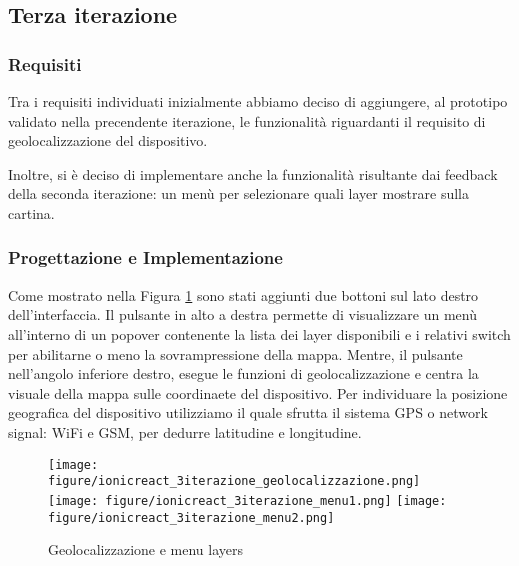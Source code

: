 \documentclass[a4paper]{report}
\begin{document}
\subsection*{{Terza iterazione}}

\subsubsection*{{Requisiti}}
Tra i requisiti individuati inizialmente abbiamo deciso di aggiungere, al prototipo validato nella precendente iterazione, le funzionalità riguardanti il requisito di geolocalizzazione del dispositivo.

Inoltre, si è deciso di implementare anche la funzionalità risultante dai feedback della seconda iterazione: un menù per selezionare quali layer mostrare sulla cartina.

\subsubsection*{{Progettazione e Implementazione}}
Come mostrato nella Figura \ref{IonicReact_3iterazione} sono stati aggiunti due bottoni sul lato destro dell'interfaccia. Il pulsante in alto a destra permette di visualizzare un menù all'interno di un popover contenente la lista dei layer disponibili e i relativi switch per abilitarne o meno la sovrampressione della mappa. Mentre, il pulsante nell'angolo inferiore destro, esegue le funzioni di geolocalizzazione e centra la visuale della mappa sulle coordinaete del dispositivo.
Per individuare la posizione geografica del dispositivo utilizziamo \cite*{cordova-plugin-geolocation} il quale sfrutta il sistema GPS o network signal: WiFi e GSM, per dedurre latitudine e longitudine.

\begin{figure}[tbp]
    \centering
    \texttt{[image: figure/ionicreact\_3iterazione\_geolocalizzazione.png]}\hfill
    \texttt{[image: figure/ionicreact\_3iterazione\_menu1.png]}\hfill
    \texttt{[image: figure/ionicreact\_3iterazione\_menu2.png]}
    \caption{Geolocalizzazione e menu layers}
    \label{IonicReact_3iterazione}
\end{figure}

\printbibliography
\end{document}
